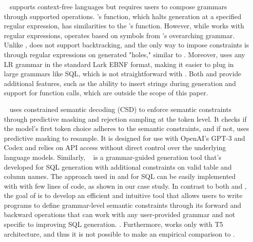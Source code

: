 \guidance{}~\cite{guidance} supports context-free languages but requires users to compose grammars through supported operations. 
\guidance{}’s  function, which halts generation at a specified regular expression, has similarities to the \Tool{}’s  function. 
However, while  works with regular expressions,  operates based on symbols from \Tool{}'s overarching grammar. 
Unlike \Tool{}, \guidance{} does not support backtracking, and the only way to impose constraints is through regular expressions on generated "holes," similar to \lmql{}. 
Moreover, \Tool{} uses any LR grammar in the standard Lark EBNF format, making it easier to plug in large grammars like SQL, which is not straightforward with \guidance{}.
Both \lmql{} and \guidance{} provide additional features, such as the ability to insert strings during generation and support for function calls, which are outside the scope of this paper.

\synchromesh{}~\cite{poesia2022synchromesh} uses constrained semantic decoding (CSD) to enforce semantic constraints through predictive masking and rejection sampling at the token level. 
It checks if the model's first token choice adheres to the semantic constraints, and if not, uses predictive masking to resample. 
It is designed for use with OpenAI's GPT-3 and Codex and relies on API access without direct control over the underlying language models. 
Similarly, \picard{}~\cite{scholak-etal-2021-picard} is a grammar-guided generation tool that's developed for SQL generation with additional constraints on valid table and column names. 
The approach used in \synchromesh{} and \picard{} for SQL can be easily implemented with \Tool{} with few lines of code, as shown in our case study. 
In contrast to both \synchromesh{} and \picard{}, the goal of \Tool{} is to develop an efficient and intuitive tool that allows users to write programs to define grammar-level semantic constraints through its forward and backward operations that can work with any user-provided grammar and not specific to improving SQL generation. . Furthermore, \picard{} works only with T5 architecture, and thus it is not possible to make an empirical comparison to \Tool{}.


